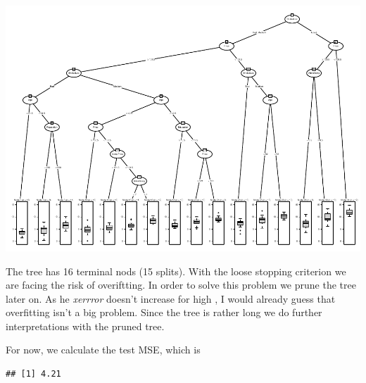 \documentclass[
]{article}
\begin{document}
\includegraphics{A3_files/figure-latex/unnamed-chunk-6-1.pdf}

The tree has 16 terminal nods (15 splits). With the loose stopping
criterion we are facing the risk of overiftting. In order to solve this
problem we prune the tree later on. As he \textit{xerrror} doesn't
increase for high , I would already guess that overfitting
isn't a big problem. Since the tree is rather long we do further
interpretations with the pruned tree.

For now, we calculate the test MSE, which is

\begin{verbatim}
## [1] 4.21
\end{verbatim}
\end{document}
